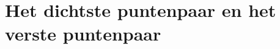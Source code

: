 \documentclass[tmi_notities.tex]{subfiles}
\begin{document}
\chapter{Het dichtste puntenpaar en het verste puntenpaar}
\end{document}
